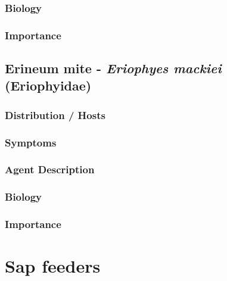 \documentclass[
]{book}
\begin{document}
\subsection*{Biology}\label{biology-7}

\subsection*{Importance}\label{importance-7}

\section*{\texorpdfstring{Erineum mite - \emph{Eriophyes mackiei} (Eriophyidae)}{Erineum mite - Eriophyes mackiei (Eriophyidae)}}\label{erineum-mite---eriophyes-mackiei-eriophyidae}

\subsection*{Distribution / Hosts}\label{distribution-hosts-8}

\subsection*{Symptoms}\label{symptoms-8}

\subsection*{Agent Description}\label{agent-description-8}

\subsection*{Biology}\label{biology-8}

\subsection*{Importance}\label{importance-8}

\chapter{Sap feeders}\label{sap}
\end{document}
